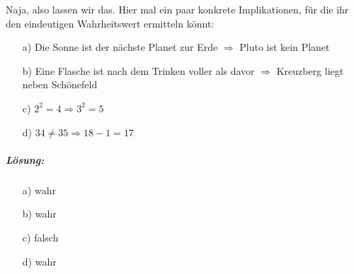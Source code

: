 \documentclass[12pt,a4paper,ngerman]{scrartcl}
\begin{document}
	Naja, also lassen wir das. Hier mal ein paar konkrete Implikationen, für die ihr den eindeutigen Wahrheitswert ermitteln könnt:
	\begin{itemize}
		\item[a)] Die Sonne ist der nächste Planet zur Erde $\Rightarrow$ Pluto ist kein Planet
		\item[b)] Eine Flasche ist nach dem Trinken voller als davor $\Rightarrow$ Kreuzberg liegt neben Schönefeld
		\item[c)] $2^2 = 4 \Rightarrow 3^2 = 5$
		\item[d)] $34 \ne 35 \Rightarrow 18-1=17$
	\end{itemize}

	\subparagraph{Lösung:}
	\begin{itemize}
		\item[a)] wahr
		\item[b)] wahr
		\item[c)] falsch
		\item[d)] wahr
	\end{itemize}
	
\end{document}
